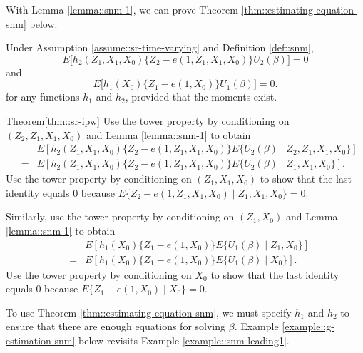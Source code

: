 With Lemma \ref{lemma::snm-1}, we can prove Theorem \ref{thm::estimating-equation-snm} below. 

\begin{theorem}
\label{thm::estimating-equation-snm}
Under Assumption \ref{assume::sr-time-varying} and Definition \ref{def::snm},
$$
E\Big[  h_2(Z_1, X_1, X_0)  \{ Z_2 - e(1, Z_1, X_1, X_0)  \}  U_2(\beta)   \Big] = 0
$$
and
$$
E\Big[    h_1(X_0)  \{  Z_1 - e(1, X_0) \}  U_1(\beta) \Big] = 0 . 
$$
for any functions $h_1$ and $h_2$, provided that the moments exist. 
\end{theorem}

 

\begin{myproof}{Theorem}{\ref{thm::sr-ipw}}
Use the tower property by conditioning on $(Z_2, Z_1, X_1, X_0)$ and Lemma \ref{lemma::snm-1} to obtain
\begin{eqnarray*}
&& E\left[  h_2(Z_1, X_1, X_0)  \{  Z_2 - e(1, Z_1, X_1, X_0)  \}   E\{U_2(\beta) \mid  Z_2, Z_1, X_1, X_0\}   \right] \\
&=& E\left[  h_2(Z_1, X_1, X_0)  \{  Z_2 - e(1, Z_1, X_1, X_0)  \}   E\{U_2(\beta) \mid  Z_1, X_1, X_0\}   \right] .
\end{eqnarray*}
Use the  tower property by conditioning on $( Z_1, X_1, X_0)$ to show that the last identity equals 0 because $E\{  Z_2 - e(1, Z_1, X_1, X_0) \mid  Z_1, X_1, X_0\} = 0. $
 
Similarly,  use the tower property by conditioning on $(Z_1, X_0)$ and Lemma \ref{lemma::snm-1} to obtain
 \begin{eqnarray*}
&& E\left[    h_1(X_0)   \{  Z_1 - e(1, X_0) \}  E \{U_1(  \beta) \mid Z_1, X_0\}  \right]  \\
&=& E\left[    h_1(X_0)   \{  Z_1 - e(1, X_0) \} E \{U_1(  \beta) \mid X_0\}  \right] .
 \end{eqnarray*}
Use the  tower property by conditioning on $X_0$ to show that the last identity equals 0 because $E\{  Z_1 - e(1, X_0) \mid X_0 \} = 0.$
\end{myproof}



To use Theorem \ref{thm::estimating-equation-snm}, we must specify $h_1$ and $h_2$ to ensure that there are enough equations for solving $\beta$. Example \ref{example::g-estimation-snm} below revisits Example \ref{example::snm-leading1}. 


